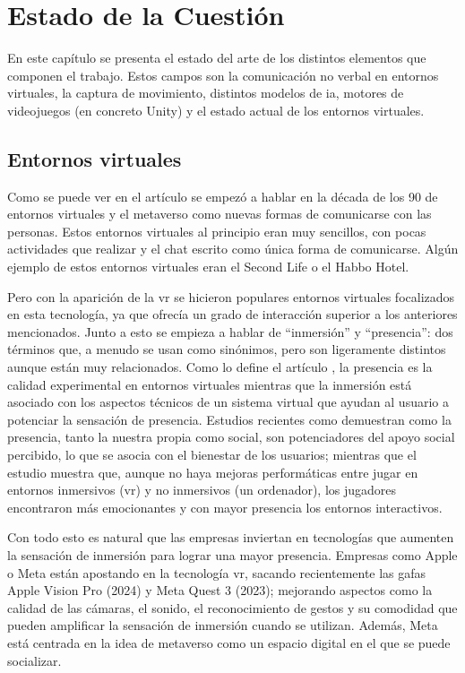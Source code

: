 \chapter{Estado de la Cuestión}
\label{cap:estadoDeLaCuestion}
En este capítulo se presenta el estado del arte de los distintos elementos que componen el trabajo. Estos campos son la comunicación no verbal en entornos virtuales, la captura de movimiento, distintos modelos de \gls{ia}, motores de videojuegos (en concreto Unity) y el estado actual de los entornos virtuales.

\section{Entornos virtuales}
Como se puede ver en el artículo \cite{NOVE} se empezó a hablar en la década de los 90 de entornos virtuales y el \gls{metaverso} como nuevas formas de comunicarse con las personas.
Estos entornos virtuales al principio eran muy sencillos, con pocas actividades que realizar y el chat escrito como única forma de comunicarse. Algún ejemplo de estos entornos virtuales eran el Second Life o el Habbo Hotel.

Pero con la aparición de la \gls{vr} se hicieron populares entornos virtuales focalizados en esta tecnología, ya que ofrecía un grado de interacción superior a los anteriores mencionados.
Junto a esto se empieza a hablar de ``inmersión'' y ``presencia'': dos términos que, a menudo se usan como sinónimos, pero son ligeramente distintos aunque están muy relacionados.
Como lo define el artículo \cite{MRPI}, la presencia es la calidad experimental en entornos virtuales mientras que la inmersión está asociado con los aspectos técnicos de un sistema virtual que ayudan al usuario a potenciar la sensación de presencia.
Estudios recientes como \cite{FPPS} demuestran como la presencia, tanto la nuestra propia como social, son potenciadores del apoyo social percibido, lo que se asocia con el bienestar de los usuarios; mientras que el estudio \cite{GVR} muestra que, aunque no haya mejoras performáticas entre jugar en entornos inmersivos (\gls{vr}) y no inmersivos (un ordenador), los jugadores encontraron más emocionantes y con mayor presencia los entornos interactivos.

Con todo esto es natural que las empresas inviertan en tecnologías que aumenten la sensación de inmersión para lograr una mayor presencia.
Empresas como Apple o Meta están apostando en la tecnología \gls{vr}, sacando recientemente las gafas Apple Vision Pro (2024) y Meta Quest 3 (2023); mejorando aspectos como la calidad de las cámaras, el sonido, el reconocimiento de gestos y su comodidad que pueden amplificar la sensación de inmersión cuando se utilizan.
Además, Meta está centrada en la idea de \gls{metaverso} como un espacio digital en el que se puede socializar.

